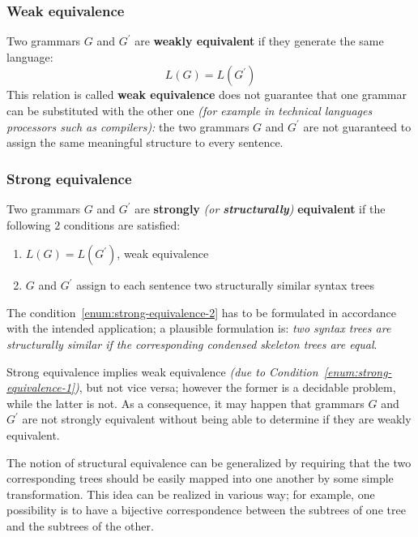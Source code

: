 \documentclass[english]{article}
\begin{document}
\subsubsection{Weak equivalence}
\label{sec:weak-equivalence}

Two grammars \(G\) and \(G^\prime\) are \textbf{weakly equivalent} if they generate the same language:
\[ L(G) = L(G^\prime) \]
This relation is called \textbf{weak equivalence} does not guarantee that one grammar can be substituted with the other one \textit{(for example in technical languages processors such as compilers):}
the two grammars \(G\) and \(G^\prime\) are not guaranteed to assign the same meaningful structure to every sentence.

\subsubsection{Strong equivalence}
\label{sec:strong-equivalence}

Two grammars \(G\) and \(G^\prime\) are \textbf{strongly} \textit{(or \textbf{structurally})} \textbf{equivalent} if the following \(2\) conditions are satisfied:

\begin{enumerate}[label=\arabic*., ref=(\arabic*)]
  \item\label{enum:strong-equivalence-1} \(L(G) = L(G^\prime)\), weak equivalence
  \item\label{enum:strong-equivalence-2} \(G\) and \(G^\prime\) assign to each sentence two structurally similar syntax trees
\end{enumerate}

The condition~\ref{enum:strong-equivalence-2} has to be formulated in accordance with the intended application;
a plausible formulation is:
\textit{two syntax trees are structurally similar if the corresponding condensed skeleton trees are equal}.

\bigskip
Strong equivalence implies weak equivalence \textit{(due to Condition~\ref{enum:strong-equivalence-1})}, but not vice versa;
however the former is a decidable problem, while the latter is not.
As a consequence, it may happen that grammars \(G\) and \(G^\prime\) are not strongly equivalent without being able to determine if they are weakly equivalent.

\bigskip
The notion of structural equivalence can be generalized by requiring that the two corresponding trees should be easily mapped into one another by some simple transformation.
This idea can be realized in various way;
for example, one possibility is to have a bijective correspondence between the subtrees of one tree and the subtrees of the other.
\end{document}
